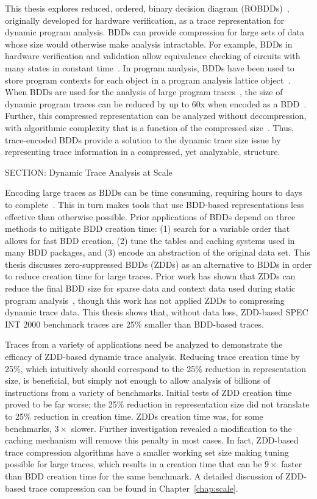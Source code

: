 {This thesis explores reduced, ordered, binary decision diagram (ROBDDs)~\cite{bryant:86:ieeetc}, originally developed for hardware verification, as a trace representation for dynamic program analysis. BDDs can provide compression for large sets of data whose size would otherwise make analysis intractable.  For example, BDDs in hardware verification and validation allow equivalence checking of circuits with many states in constant time~\cite{brayton:96:cav}.  In program analysis, BDDs have been used to store program contexts for each object in a program analysis lattice object~\cite{whaley:07:thesis}. When BDDs are used for the analysis of large program traces~\cite{price:06:cal,price:08:pact,zhang:04:icse}, the size of dynamic program traces can be reduced by up to 60x when encoded as a BDD~\cite{price:06:cal}.  Further, this compressed representation can be analyzed without decompression, with algorithmic complexity that is a function of the compressed size~\cite{price:06:cal}.  Thus, trace-encoded BDDs provide a solution to the dynamic trace size issue by representing trace information in a compressed, yet analyzable, structure.

SECTION: Dynamic Trace Analysis at Scale


Encoding large traces as BDDs can be time consuming, requiring hours to days to complete~\cite{price:08:msthesis}.  This in turn makes tools that use BDD-based representations less effective than otherwise possible.  Prior applications of BDDs depend on three methods to mitigate BDD creation time: (1) search for a variable order that allows for fast BDD creation, (2) tune the tables and caching systems used in many BDD packages, and (3) encode an abstraction of the original data set.  This thesis discusses zero-suppressed BDDs (ZDDs) as an alternative to BDDs in order to reduce creation time for large traces.  Prior work has shown that ZDDs can reduce the final BDD size for sparse data and context data used during static program analysis~\cite{minato:01:STTT, lhotak:08:lcpc}, though this work has not applied ZDDs to compressing dynamic trace data.  This thesis shows that, without data loss, ZDD-based SPEC INT 2000 benchmark traces are 25\% smaller than BDD-based traces.

Traces from a variety of applications need be analyzed to demonstrate the efficacy of ZDD-based dynamic trace analysis.  Reducing trace creation time by 25\%, which intuitively should correspond to the 25\% reduction in representation size, is beneficial, but simply not enough to allow analysis of billions of instructions from a variety of benchmarks.  Initial tests of ZDD creation time proved to be far worse; the 25\% reduction in representation size did not translate to 25\% reduction in creation time.  ZDDs creation time was, for some benchmarks, $3\times$ slower.  Further investigation revealed a modification to the caching mechanism will remove this penalty in most cases.  In fact, ZDD-based trace compression algorithms have a smaller working set size making tuning possible for large traces, which results in a creation time that can be $9\times$ faster than BDD creation time for the same benchmark.  A detailed discussion of ZDD-based trace compression can be found in Chapter~\ref{chap:scale}.

}
